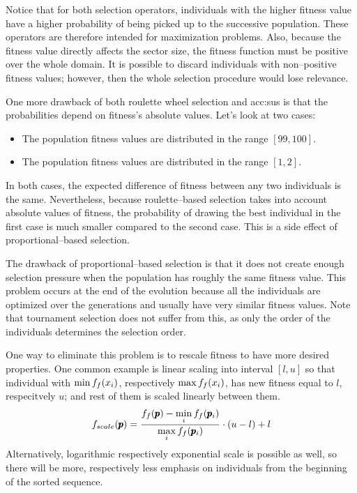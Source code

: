 Notice that for both selection operators, individuals with the higher fitness value have a higher probability of being picked up to the successive population. These operators are therefore intended for maximization problems. Also, because the fitness value directly affects the sector size, the fitness function must be positive over the whole domain. It is possible to discard individuals with non--positive fitness values; however, then the whole selection procedure would lose relevance.

One more drawback of both roulette wheel selection and \acrshort{acc:sus} is that the probabilities depend on fitness's absolute values. Let's look at two cases:
\begin{itemize}
    \item The population fitness values are distributed in the range $\left[ 99,100 \right]$.
    \item The population fitness values are distributed in the range $\left[ 1, 2\right]$.
\end{itemize}
In both cases, the expected difference of fitness between any two individuals is the same. Nevertheless, because roulette--based selection takes into account absolute values of fitness, the probability of drawing the best individual in the first case is much smaller compared to the second case. This is a side effect of proportional--based selection.

The drawback of proportional--based selection is that it does not create enough selection pressure when the population has roughly the same fitness value. This problem occurs at the end of the evolution because all the individuals are optimized over the generations and usually have very similar fitness values. Note that tournament selection does not suffer from this, as only the order of the individuals determines the selection order.

One way to eliminate this problem is to rescale fitness to have more desired properties. One common example is linear scaling into interval $\left[ l,u \right]$ so that individual with $\min f_f(x_i)$, respectively $\max f_f(x_i)$, has new fitness equal to $l$, respecitvely $u$; and rest of them is scaled linearly between them. 
$$
f_{scale}(\pmb{p})=\frac{f_f(\pmb{p}) - \min\limits_{i}f_f(\pmb{p}_i)}{\max\limits_{i}f_f(\pmb{p}_i)}\cdot(u-l)+l 
$$
Alternatively, logarithmic respectively exponential scale is possible as well, so there will be more, respectively less emphasis on individuals from the beginning of the sorted sequence.

